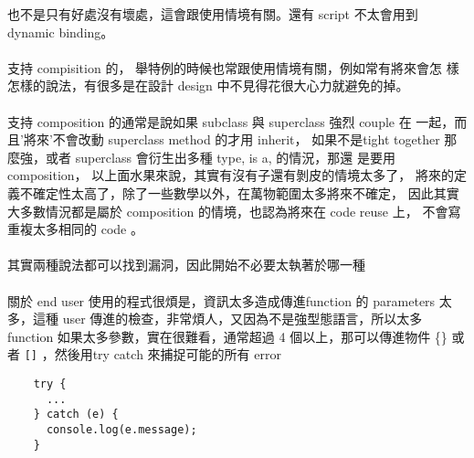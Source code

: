     也不是只有好處沒有壞處，這會跟使用情境有關。還有 script 不太會用到
    dynamic binding。
    \\\\
    支持 compisition 的， 舉特例的時候也常跟使用情境有關，例如常有將來會怎
    樣怎樣的說法，有很多是在設計 design 中不見得花很大心力就避免的掉。
    \\\\
    支持 composition 的通常是說如果 subclass 與 superclass 強烈 couple 在
    一起，而且'將來'不會改動 superclass method 的才用 inherit， 如果不是tight
    together 那麼強，或者 superclass 會衍生出多種 type, is a, 的情況，那還
    是要用 composition， 以上面水果來說，其實有沒有子還有剝皮的情境太多了，
    將來的定義不確定性太高了，除了一些數學以外，在萬物範圍太多將來不確定，
    因此其實大多數情況都是屬於 composition 的情境，也認為將來在 code reuse
    上， 不會寫重複太多相同的 code 。
    \\\\
    其實兩種說法都可以找到漏洞，因此開始不必要太執著於哪一種
    \\\\
    關於 end user 使用的程式很煩是，資訊太多造成傳進function 的 parameters
    太多，這種 user 傳進的檢查，非常煩人，又因為不是強型態語言，所以太多
    function 如果太多參數，實在很難看，通常超過 4 個以上，那可以傳進物件 
    \{\} 或者 \verb=[]= ，然後用try catch 來捕捉可能的所有 error
    \begin{verbatim}
    try {
      ...
    } catch (e) {
      console.log(e.message);
    }
    \end{verbatim}
